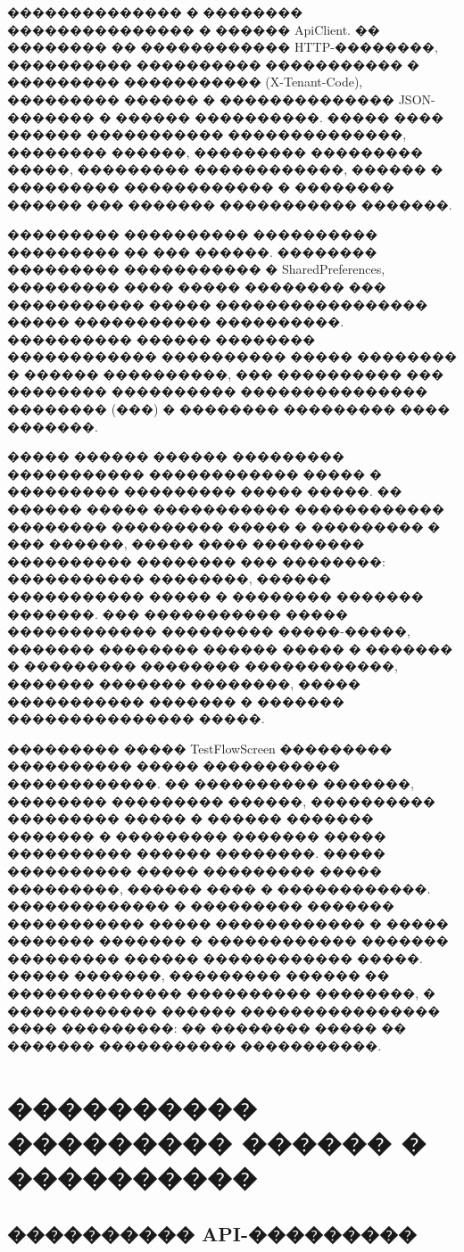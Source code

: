 �������������� � �������� ��������������� � ������ ApiClient. �� �������� �� ������������ HTTP-��������, ���������� ���������� ����������� � ��������� ����������� (X-Tenant-Code), ��������� ������ � �������������� JSON-������� � ������ ����������. ����� ���� ������ ����������� ��������������, �������� ������, ��������� ��������� �����, ��������� ������������, ������ � ��������� ������������ � �������� ������ ��� ������� ����������� �������.

��������� ���������� ���������� ��������� �� ��� ������. �������� ��������� ����������� � SharedPreferences, ��������� ���� ����� �������� ��� ����������� ����� ����������������� ����� ����������� ����������. ���������� ������ �������� ������������ ���������� ����� �������� � ������ ����������, ��� ���������� ��� �������� ���������� ��������������� �������� (���) � �������� ��������� ���� �������.

����� ������ ������ ��������� ����������� ������������ ����� � ��������� ��������� ����� �����. �� ������ ����� ����������� ������������ �������� ��������� ����� � ��������� � ��� ������, ����� ���� ��������� ���������� �������� ��� ��������: ����������� ��������, ������ ����������� ����� � �������� ������� �������. ��� ����������� ����� ������������ ��������� �����-�����, ������� �������� ������ ����� � ������� � ��������� �������� ������������, ������� ������� ��������, ����� ����������� ������� � ������� ��������������� �����.

��������� ����� TestFlowScreen ��������� ���������� ����� ����������� ������������. �� ���������� �������, �������� ��������� ������, ���������� ��������� ����� � ������ ������� ������� � ��������� ������� ����� ���������� ������ ��������. ����� ���������� ����� ��������� ����� ���������, ������ ���� � ������������. ������������� � ��������� ������� ����������� ����� ������������ � ����� ������� ������� � ������������ ������� ��������� ������ ������������ �����. ����� �������, ��������� ������ �� �������������� ���������� ��������, � ������������ ������ ���������������� ���� ���������: �� �������� ����� �� ������� ����������� �����������.

\section{���������� ��������� ������ � ����������}

\subsection{���������� API-���������}


